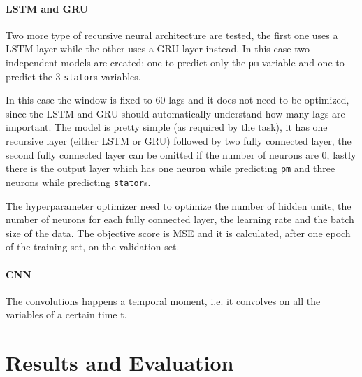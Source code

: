 \paragraph{LSTM and GRU}
Two more type of recursive neural architecture are tested, the first one uses a LSTM layer while the other uses a GRU layer instead.
In this case two independent models are created: one to predict only the \verb|pm| variable and one to predict the 3 \verb|stator|s variables.

In this case the window is fixed to 60 lags and it does not need to be optimized, since the LSTM and GRU should automatically understand how many lags are important.
The model is pretty simple (as required by the task), it has one recursive layer (either LSTM or GRU) followed by two fully connected layer, the second fully connected layer can be omitted if the number of neurons are 0, lastly there is the output layer which has one neuron while predicting \verb|pm| and three neurons while predicting \verb|stator|s.

The hyperparameter optimizer need to optimize the number of hidden units, the number of neurons for each fully connected layer, the learning rate and the batch size of the data.
The objective score is MSE and it is calculated, after one epoch of the training set, on the validation set.

\paragraph{CNN}
The convolutions happens a temporal moment, i.e. it convolves on all the variables of a certain time t.




\section{Results and Evaluation}
 
